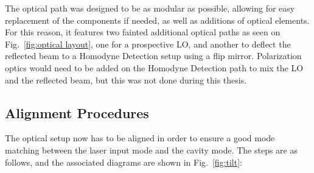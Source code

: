 The optical path was designed to be as modular as possible, allowing for easy replacement of the components if needed, as well as additions of optical elements. For this reason, it features two fainted additional optical paths as seen on Fig.~\ref{fig:optical layout}, one for a prospective LO, and another to deflect the reflected beam to a Homodyne Detection setup using a flip mirror. Polarization optics would need to be added on the Homodyne Detection path to mix the LO and the reflected beam, but this was not done during this thesis.

\subsection{Alignment Procedures}\label{sec:alignment_procedure}
The optical setup now has to be aligned in order to ensure a good mode matching between the laser input mode and the cavity mode. The steps are as follows, and the associated diagrams are shown in Fig.~\ref{fig:tilt}:

